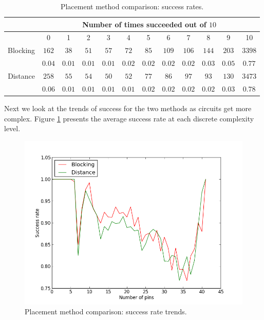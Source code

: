 \begin{table}[H]
\begin{center}
\begin{singlespace}
\begin{tabular}{|c||c|c|c|c|c|c|c|c|c|c|c|}
\hline
 & \multicolumn{11}{|c|}{Number of times succeeded out of $10$} \\
\hline
 & 0 & 1 & 2 & 3 & 4 & 5 & 6 & 7 & 8 & 9 & 10 \\
\hline\hline
Blocking & $162$ & $38$ & $51$ & $57$ & $72$ & $85$ & $109$ & $106$ & $144$ & $203$ & $3398$ \\
 & $0.04$ & $0.01$ & $0.01$ & $0.01$ & $0.02$ & $0.02$ & $0.02$ & $0.02$ & $0.03$ & $0.05$ & $0.77$ \\
\hline
 Distance & $258$ & $55$ & $54$ & $50$ & $52$ & $77$ & $86$ & $97$ & $93$ & $130$ & $3473$ \\
  & $0.06$ & $0.01$ & $0.01$ & $0.01$ & $0.01$ & $0.02$ & $0.02$ & $0.02$ & $0.02$ & $0.03$ & $0.78$ \\
\hline
\end{tabular}
\end{singlespace}
\end{center}
\label{tb:placement_success}
\caption{Placement method comparison: success rates.}
\end{table}

Next we look at the trends of success for the two methods as circuits get more
complex. Figure \ref{fig:placement_success_trend} presents the average success
rate at each discrete complexity level.

\begin{figure}[H]
\begin{center}
\includegraphics[width=\textwidth]{Images/placement_success_trend_comparison.png}
\caption{Placement method comparison: success rate trends.}
\label{fig:placement_success_trend}
\end{center}
\end{figure}

